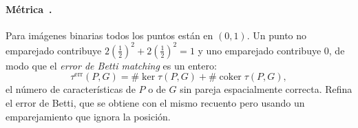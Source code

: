 \paragraph{Métrica~\cite[§3.3]{stucki2023}.} Para imágenes binarias todos los puntos están en
$(0,1)$. Un punto no emparejado contribuye
$2(\tfrac12)^2+2(\tfrac12)^2=1$ y uno emparejado contribuye $0$, de modo que
el \emph{error de Betti matching} es un entero:
\[
  \tau^{\mathrm{err}}(P,G)=\#\ker\tau(P,G)+\#\operatorname{coker}\tau(P,G),
\]
el número de características de $P$ o de $G$ sin pareja espacialmente
correcta. Refina el error de Betti, que se obtiene con el mismo recuento
pero usando un emparejamiento que ignora la posición.